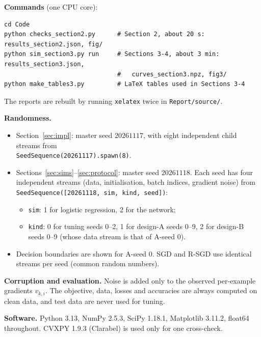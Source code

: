 \documentclass[11pt,a4paper]{article}
\begin{document}
\textbf{Commands} (one CPU core):
\begin{lstlisting}
cd Code
python checks_section2.py      # Section 2, about 20 s: results_section2.json, fig/
python sim_section3.py run     # Sections 3-4, about 3 min: results_section3.json,
                               #   curves_section3.npz, fig3/
python make_tables3.py         # LaTeX tables used in Sections 3-4
\end{lstlisting}
The reports are rebuilt by running \texttt{xelatex} twice in \texttt{Report/source/}.

\textbf{Randomness.}
\begin{itemize}
\item Section~\ref{sec:impl}: master seed $20261117$, with eight independent child streams
from\\ \texttt{SeedSequence(20261117).spawn(8)}.
\item Sections~\ref{sec:sims}--\ref{sec:protocol}: master seed $20261118$. Each seed has four
independent streams (data, initialisation, batch indices, gradient noise) from
\texttt{SeedSequence([20261118, sim, kind, seed])}:
  \begin{itemize}
  \item \texttt{sim}: 1 for logistic regression, 2 for the network;
  \item \texttt{kind}: 0 for tuning seeds 0--2, 1 for design-A seeds 0--9, 2 for design-B seeds
  0--9 (whose data stream is that of A-seed 0).
  \end{itemize}
\item Decision boundaries are shown for A-seed 0. SGD and R-SGD use identical streams per seed
(common random numbers).
\end{itemize}

\textbf{Corruption and evaluation.} Noise is added only to the observed per-example gradients
$v_{k,i}$. The objective, data, losses and accuracies are always computed on clean data, and test
data are never used for tuning.

\textbf{Software.} Python 3.13, NumPy 2.5.3, SciPy 1.18.1, Matplotlib 3.11.2, float64 throughout.
CVXPY 1.9.3 (Clarabel) is used only for one cross-check.
\end{document}
